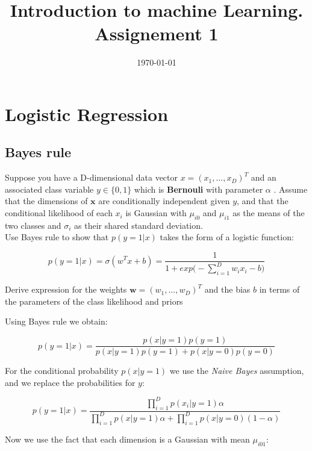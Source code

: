 \documentclass[a4paper]{tufte-handout}
\title{Introduction to machine Learning. Assignement 1}
\date{\today}
\begin{document}
\maketitle

\section{Logistic Regression}%
\label{sec:logreg}

\subsection{Bayes rule}%
\label{sub:baye_s_rule}

Suppose you have a D-dimensional data vector $x=(x_1,\ldots,x_D)^T$ and an
associated class variable $y\in\{0,1\}$ which is \textbf{Bernouli} with parameter
$\alpha$ . Assume that the dimensions of $\mathbf{x}$ are conditionally
independent given $y$, and that the conditional likelihood of each $x_i$ is
Gaussian with $\mu_{i0}$ and $\mu_{i1}$ as the means of the two classes and
$\sigma_i$ as their shared standard deviation.\\

Use Bayes rule to show that $p(y=1|x)$ takes the form of a logistic function:

\begin{equation}
  p(y=1|x) = \sigma(w^Tx+b) = \dfrac{1}{1 + exp\big(-\sum_{i=1}^D w_ix_i-b\big)}
\end{equation}

Derive expression for the weights $\mathbf{w}= (w_1,\ldots,w_D)^T$ and the bias
$b$ in terms of the parameters of the class likelihood and priors

Using Bayes rule we obtain:

\begin{equation*}
  p(y=1|x) =  \dfrac{p(x|y=1)p(y=1)}{p(x|y=1)p(y=1)+p(x|y=0)p(y=0)}
\end{equation*}

For the conditional probability $p(x|y=1)$ we use the \emph{Naive Bayes}
assumption, and we replace the probabilities for $y$:


\begin{equation}
  p(y=1|x) = \dfrac{ \prod_{i=1}^D
  p(x_i|y=1)\alpha}{\prod_{i=1}^Dp(x|y=1)\alpha+\prod_{i=1}^Dp(x|y=0)(1-\alpha)}
\end{equation}


Now we use the fact that each dimension is a Gaussian with mean $\mu_{i01}$:
\end{document}
